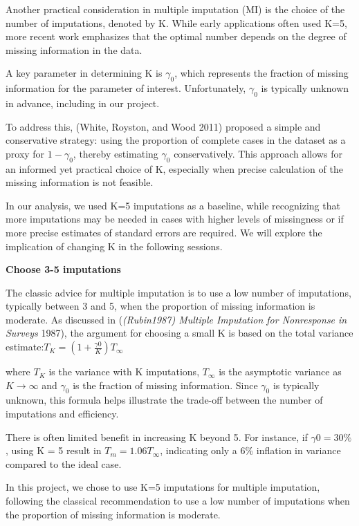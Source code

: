 \documentclass{article}
\begin{document}
Another practical consideration in multiple imputation (MI) is the
choice of the number of imputations, denoted by K. While early
applications often used K=5, more recent work emphasizes that the
optimal number depends on the degree of missing information in the data.

A key parameter in determining K is \(\gamma_{0}\), which represents the
fraction of missing information for the parameter of interest.
Unfortunately, \(\gamma_{0}\) is typically unknown in advance, including
in our project.

To address this, (White, Royston, and Wood 2011) proposed a simple and
conservative strategy: using the proportion of complete cases in the
dataset as a proxy for \(1-\gamma_{0}\), thereby estimating
\(\gamma_{0}\) conservatively. This approach allows for an informed yet
practical choice of K, especially when precise calculation of the
missing information is not feasible.

In our analysis, we used K=5 imputations as a baseline, while
recognizing that more imputations may be needed in cases with higher
levels of missingness or if more precise estimates of standard errors
are required. We will explore the implication of changing K in the
following sessions.

\textbf{Choose 3-5 imputations}

The classic advice for multiple imputation is to use a low number of
imputations, typically between 3 and 5, when the proportion of missing
information is moderate. As discussed in (\emph{(Rubin1987) Multiple
Imputation for Nonresponse in Surveys} 1987), the argument for choosing
a small K is based on the total variance
estimate:\(T_{K} = (1 + \frac{\gamma0}{K}) T_{\infty}\)

where \(T_{K}\) is the variance with K imputations, \(T_{\infty}\) is
the asymptotic variance as \(K \rightarrow \infty\) and \(\gamma_{0}\)
is the fraction of missing information. Since \(\gamma_{0}\) is
typically unknown, this formula helps illustrate the trade-off between
the number of imputations and efficiency.

There is often limited benefit in increasing K beyond 5. For instance,
if \(\gamma0=30\%\), using K = 5 result in \(T_m=1.06T_\infty\),
indicating only a 6\% inflation in variance compared to the ideal case.

In this project, we chose to use K=5 imputations for multiple
imputation, following the classical recommendation to use a low number
of imputations when the proportion of missing information is moderate.
\end{document}

